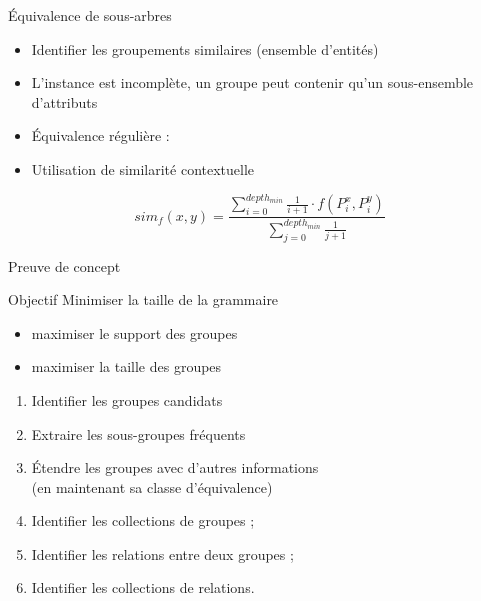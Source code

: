\begin{frame}{Équivalence de sous-arbres}
    \begin{itemize}
        \item Identifier les groupements similaires (ensemble d'entités)
        \item L'instance est incomplète, un groupe peut contenir qu'un sous-ensemble d'attributs
              \pause
        \item Équivalence régulière : 
              \pause
        \item Utilisation de similarité contextuelle
    \end{itemize}

    \vfill

    \begin{equation*}
        sim_f(x, y) = \frac{\sum_{i=0}^{depth_{min}} \frac{1}{i + 1} \cdot f(P^x_i, P^y_i)}{\sum_{j=0}^{depth_{min}} \frac{1}{j + 1}} \label{eq:struct:sim}
    \end{equation*}
\end{frame}

\begin{frame}{Preuve de concept}
    \begin{block}{Objectif}
        Minimiser la taille de la grammaire
        \pause
        \begin{itemize}
            \item maximiser le support des groupes
            \item maximiser la taille des groupes
        \end{itemize}
    \end{block}

    \vfill
    \pause

    \begin{enumerate}
        \item Identifier les groupes candidats
        \item Extraire les sous-groupes fréquents
        \item Étendre les groupes avec d'autres informations\\(en maintenant sa classe d'équivalence)
        \item Identifier les collections de groupes ;
        \item Identifier les relations entre deux groupes ;
        \item Identifier les collections de relations.
    \end{enumerate}
\end{frame}

